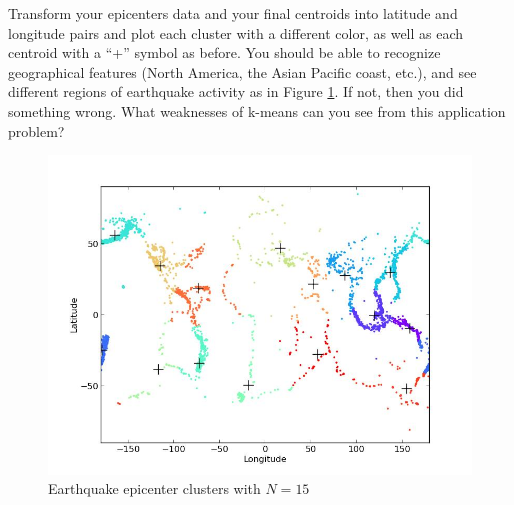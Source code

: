 \begin{problem}
Transform your epicenters data and your final centroids into latitude and longitude pairs and plot each cluster with a different color, as well as each centroid with a ``+'' symbol as before. You should be able to recognize geographical features (North America, the Asian Pacific coast, etc.), and see different regions of earthquake activity as in Figure \ref{fig:earthquakeclusters}. If not, then you did something wrong. What weaknesses of k-means can you see from this application problem?
\end{problem}
\begin{figure} 
	\centering
	\includegraphics[width=\textwidth]{clusters.jpg}
	\caption{Earthquake epicenter clusters with $N = 15$}
	\label{fig:earthquakeclusters}
\end{figure}